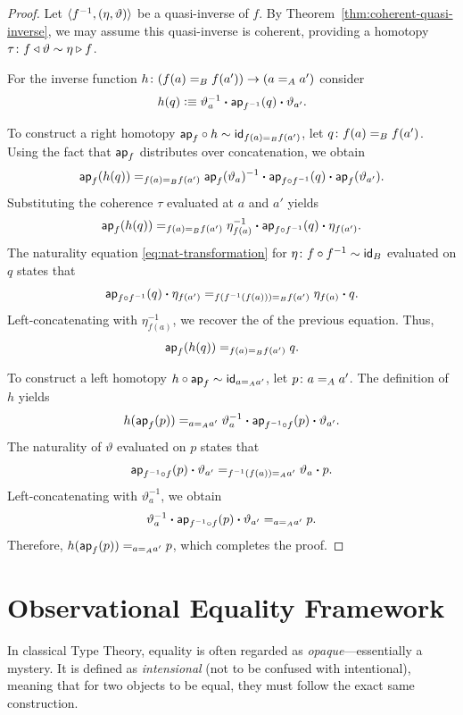 \begin{proof}
    Let $\langle f^{-1},(\eta,\vartheta)\rangle$ be a quasi-inverse of $f$. By Theorem~\ref{thm:coherent-quasi-inverse}, we may assume this quasi-inverse is coherent, providing a homotopy $\tau\colon f\lwct\vartheta\sim\eta\rwct f$.

    For the inverse function $h\colon(f(a)\eq Bf(a'))\to(a\eq Aa')$ consider
    \[
        h(q)\mathrel{\vcentcolon}\equiv\vartheta_a^{-1}\mathbin{\boldsymbol{\cdot}}\mathsf{ap}_{f^{-1}}(q)\mathbin{\boldsymbol{\cdot}}\vartheta_{a'}.
    \]

    To construct a right homotopy $\mathsf{ap}_f\circ h\sim\mathsf{id}_{f(a)\mathrel{=_{B}}f(a')}$, let $q\colon f(a)\eq Bf(a')$. Using the fact that $\mathsf{ap}_f$ distributes over concatenation, we obtain
    \[
        \mathsf{ap}_f(h(q))
        \mathrel{=_{f(a)\mathrel{=_{B}}f(a')}}
        \mathsf{ap}_f(\vartheta_a)^{-1}
            \mathbin{\boldsymbol{\cdot}}\mathsf{ap}_{f\circ f^{-1}}(q)
            \mathbin{\boldsymbol{\cdot}}\mathsf{ap}_f(\vartheta_{a'}).
    \]
    Substituting the coherence $\tau$ evaluated at $a$ and $a'$ yields
    \[
        \mathsf{ap}_f(h(q))
        \mathrel{=_{f(a)\mathrel{=_{B}}f(a')}}
        \eta_{f(a)}^{-1}
            \mathbin{\boldsymbol{\cdot}}\mathsf{ap}_{f\circ f^{-1}}(q)
            \mathbin{\boldsymbol{\cdot}}\eta_{f(a')}.
    \]
    The naturality equation \eqref{eq:nat-transformation} for $\eta\colon f\circ f^{-1}\sim\id_B$ evaluated on $q$ states that
    \[
        \mathsf{ap}_{f\circ f^{-1}}(q)\mathbin{\boldsymbol{\cdot}}\eta_{f(a')}
        \mathrel{=_{f(f^{-1}(f(a)))\mathrel{=_{B}}f(a')}}
        \eta_{f(a)}\mathbin{\boldsymbol{\cdot}} q.
    \]
    Left-concatenating with $\eta_{f(a)}^{-1}$, we recover the \rhs of the previous equation. Thus,
    \[
        \mathsf{ap}_f(h(q))\mathrel{=_{f(a)\mathrel{=_{B}}f(a')}}q.
    \]

    To construct a left homotopy $h\circ\mathsf{ap}_f\sim\mathsf{id}_{a\mathrel{=_{A}}a'}$, let $p\colon a\eq Aa'$. The definition of $h$ yields
    \[
        h(\mathsf{ap}_f(p))
        \mathrel{=_{a\mathrel{=_{A}}a'}}
        \vartheta_a^{-1}
            \mathbin{\boldsymbol{\cdot}}\mathsf{ap}_{f^{-1}\circ f}(p)
            \mathbin{\boldsymbol{\cdot}}\vartheta_{a'}.
    \]
    The naturality of $\vartheta$ evaluated on $p$ states that
    \[
        \mathsf{ap}_{f^{-1}\circ f}(p)
            \mathbin{\boldsymbol{\cdot}}\vartheta_{a'}
        \mathrel{=_{f^{-1}(f(a))\mathrel{=_{A}}a'}}
        \vartheta_a\mathbin{\boldsymbol{\cdot}} p.
    \]
    Left-concatenating with $\vartheta_a^{-1}$, we obtain
    \[
        \vartheta_a^{-1}
            \mathbin{\boldsymbol{\cdot}}\mathsf{ap}_{f^{-1}\circ f}(p)
            \mathbin{\boldsymbol{\cdot}}\vartheta_{a'}
        \mathrel{=_{a\mathrel{=_{A}}a'}}
        p.
    \]
    Therefore, $h(\mathsf{ap}_f(p))\mathrel{=_{a\mathrel{=_{A}}a'}}p$, which completes the proof.
\end{proof}

\section{Observational Equality Framework}
In classical Type Theory, equality is often regarded as \textit{opaque}---essentially a mystery. It is defined as \emph{intensional} (not to be confused with intentional), meaning that for two objects to be equal, they must follow the exact same construction.

